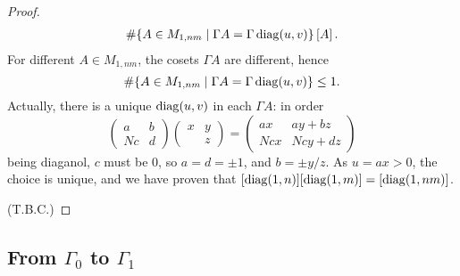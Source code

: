 \begin{proof}
\begin{align*}
        \#\{A\in M_{1, nm}\mid \Gamma A = \Gamma\operatorname{diag}(u, v)\}\left[ A \right].
    \end{align*}
    For different $A\in M_{1, nm}$, 
    the cosets $\Gamma A$ are different,
    hence \[\#\{A\in M_{1, nm}\mid \Gamma A = \Gamma\operatorname{diag}(u, v)\}\le 1.\]
    Actually, there is a unique $\operatorname{diag}(u, v)$ in each $\Gamma A$:
    in order \[\begin{pmatrix}
        a & b \\ Nc & d
    \end{pmatrix}\begin{pmatrix}
        x & y \\ & z
    \end{pmatrix} = \begin{pmatrix}
        ax & ay + bz \\ Ncx & Ncy + dz
    \end{pmatrix}\]
    being diaganol, $c$ must be $0$, so $a = d = \pm1$,
    and $b = \pm y/z$. As $u = ax > 0$, the choice is unique,
    and we have proven that $[\operatorname{diag}(1, n)][\operatorname{diag}(1, m)] = [\operatorname{diag}(1, nm)]$.

    (T.B.C.)
\end{proof}


\subsection{From \texorpdfstring{$\Gamma_0$ to $\Gamma_1$}{Gamma0 to Gamma1}}

